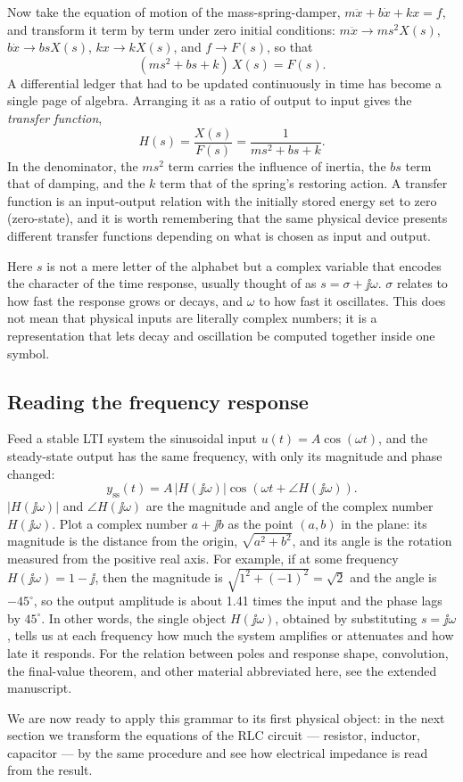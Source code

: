 Now take the equation of motion of the mass-spring-damper,
$m\ddot{x}+b\dot{x}+kx=f$, and transform it term by term under zero initial
conditions:
$m\ddot{x}\to m s^2 X(s)$, $b\dot{x}\to b s X(s)$, $kx\to kX(s)$, and
$f\to F(s)$, so that
\begin{equation}
  (m s^2 + b s + k)\,X(s) = F(s).
\end{equation}
A differential ledger that had to be updated continuously in time has become
a single page of algebra.
Arranging it as a ratio of output to input gives the \emph{transfer
function},
\begin{equation}
  H(s) = \frac{X(s)}{F(s)} = \frac{1}{m s^2 + b s + k}.
  \label{eq:u5-msd-tf}
\end{equation}
In the denominator, the $ms^2$ term carries the influence of inertia, the
$bs$ term that of damping, and the $k$ term that of the spring's restoring
action.
A transfer function is an input-output relation with the initially stored
energy set to zero (zero-state), and it is worth remembering that the same
physical device presents different transfer functions depending on what is
chosen as input and output.

Here $s$ is not a mere letter of the alphabet but a complex variable that
encodes the character of the time response, usually thought of as
$s=\sigma+\jj\omega$.
$\sigma$ relates to how fast the response grows or decays, and $\omega$ to
how fast it oscillates.
This does not mean that physical inputs are literally complex numbers; it is
a representation that lets decay and oscillation be computed together
inside one symbol.

\subsection{Reading the frequency response}

Feed a stable LTI system the sinusoidal input $u(t)=A\cos(\omega t)$, and
the steady-state output has the same frequency, with only its magnitude and
phase changed:
\begin{equation}
  y_{\mathrm{ss}}(t)
  = A\,|H(\jj\omega)|\cos\!\left(\omega t + \angle H(\jj\omega)\right).
\end{equation}
$|H(\jj\omega)|$ and $\angle H(\jj\omega)$ are the magnitude and angle of
the complex number $H(\jj\omega)$.
Plot a complex number $a+\jj b$ as the point $(a,b)$ in the plane: its
magnitude is the distance from the origin, $\sqrt{a^2+b^2}$, and its angle
is the rotation measured from the positive real axis.
For example, if at some frequency $H(\jj\omega)=1-\jj$, then the magnitude
is $\sqrt{1^2+(-1)^2}=\sqrt{2}$ and the angle is $-45^\circ$, so the output
amplitude is about 1.41 times the input and the phase lags by $45^\circ$.
In other words, the single object $H(\jj\omega)$, obtained by substituting
$s=\jj\omega$, tells us at each frequency how much the system amplifies or
attenuates and how late it responds.
For the relation between poles and response shape, convolution, the
final-value theorem, and other material abbreviated here, see the extended
manuscript.

We are now ready to apply this grammar to its first physical object: in the
next section we transform the equations of the RLC circuit --- resistor,
inductor, capacitor --- by the same procedure and see how electrical
impedance is read from the result.
